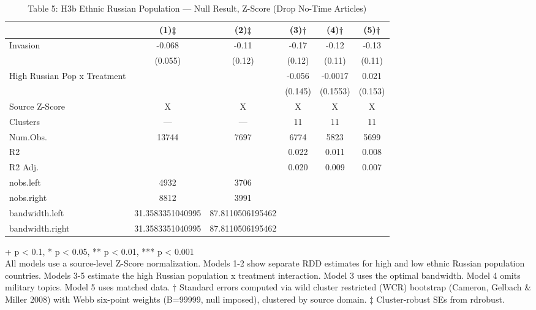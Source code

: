 \begin{table}[t]
\caption{\label{tab:table-05b}Table 5: H3b Ethnic Russian Population — Null Result, Z-Score (Drop No-Time Articles)} 
\fontsize{12.0pt}{14.0pt}\selectfont
\begin{tabular*}{\linewidth}{@{\extracolsep{\fill}}lccccc}
\toprule
  & (1)‡ & (2)‡ & (3)† & (4)† & (5)† \\ 
\midrule\addlinespace[2.5pt]
Invasion & -0.068 & -0.11 & -0.17 & -0.12 & -0.13 \\ 
 & (0.055) & (0.12) & (0.12) & (0.11) & (0.11) \\ 
High Russian Pop x Treatment &  &  & -0.056 & -0.0017 & 0.021 \\ 
{} & {} & {} & {(0.145)} & {(0.1553)} & {(0.153)} \\ 
Source Z-Score & X & X & X & X & X \\ 
Clusters & — & — & 11 & 11 & 11 \\ 
Num.Obs. & 13744 & 7697 & 6774 & 5823 & 5699 \\ 
R2 &  &  & 0.022 & 0.011 & 0.008 \\ 
R2 Adj. &  &  & 0.020 & 0.009 & 0.007 \\ 
nobs.left & 4932 & 3706 &  &  &  \\ 
nobs.right & 8812 & 3991 &  &  &  \\ 
bandwidth.left & 31.3583351040995 & 87.8110506195462 &  &  &  \\ 
bandwidth.right & 31.3583351040995 & 87.8110506195462 &  &  &  \\ 
\bottomrule
\end{tabular*}
\begin{minipage}{\linewidth}
\vspace{.05em}
+ p < 0.1, * p < 0.05, ** p < 0.01, *** p < 0.001\\
All models use a source-level Z-Score normalization. Models 1-2 show separate
RDD estimates for high and low ethnic Russian population countries. Models 3-5
estimate the high Russian population x treatment interaction. Model 3 uses the
optimal bandwidth. Model 4 omits military topics. Model 5 uses matched data. †
Standard errors computed via wild cluster restricted (WCR) bootstrap (Cameron,
Gelbach \& Miller 2008) with Webb six-point weights (B=99999, null imposed),
clustered by source domain. ‡ Cluster-robust SEs from rdrobust.\\
\end{minipage}
\end{table}

